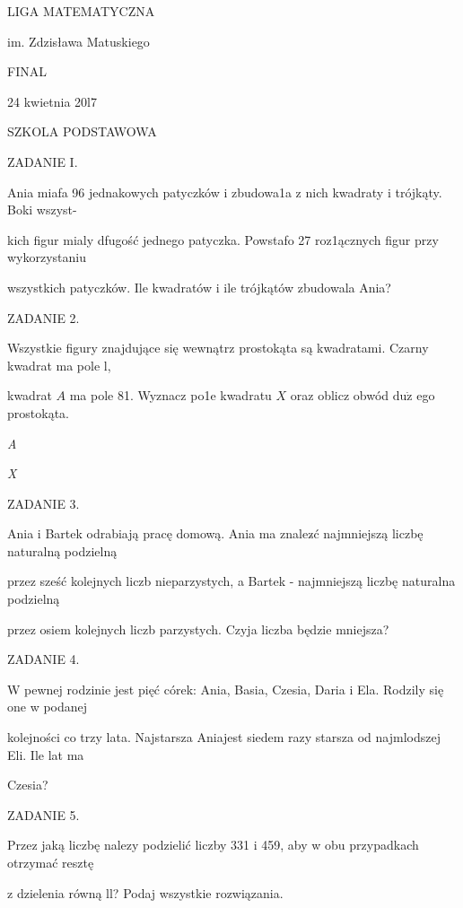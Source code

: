 \documentclass[a4paper,12pt]{article}
\begin{document}
LIGA MATEMATYCZNA

im. Zdzisława Matuskiego

FINAL

24 kwietnia 20l7

SZKOLA PODSTAWOWA

ZADANIE I.

Ania miafa 96 jednakowych patyczków i zbudowa1a z nich kwadraty i trójkąty. Boki wszyst-

kich figur mialy dfugość jednego patyczka. Powstafo 27 roz1ącznych figur przy wykorzystaniu

wszystkich patyczków. Ile kwadratów i ile trójkątów zbudowala Ania?

ZADANIE 2.

Wszystkie figury znajdujące się wewnątrz prostokąta są kwadratami. Czarny kwadrat ma pole l,

kwadrat $A$ ma pole 81. Wyznacz po1e kwadratu $X$ oraz oblicz obwód $\mathrm{d}\mathrm{u}\dot{\mathrm{z}}$ ego prostokąta.

{\it A}

{\it X}

ZADANIE 3.

Ania i Bartek odrabiają pracę domową. Ania ma znalez$\acute{}$ć najmniejszą liczbę naturalną podzielną

przez sześć kolejnych liczb nieparzystych, a Bartek - najmniejszą liczbę naturalna podzielną

przez osiem kolejnych liczb parzystych. Czyja liczba będzie mniejsza?

ZADANIE 4.

W pewnej rodzinie jest pięć córek: Ania, Basia, Czesia, Daria i Ela. Rodzily się one w podanej

kolejności co trzy lata. Najstarsza Aniajest siedem razy starsza od najmlodszej Eli. Ile lat ma

Czesia?

ZADANIE 5.

Przez jaką liczbę nalezy podzielić liczby 331 i 459, aby w obu przypadkach otrzymać resztę

z dzielenia równą ll? Podaj wszystkie rozwiązania.
\end{document}
